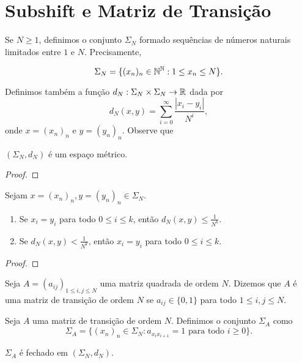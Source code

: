 \section{Subshift e Matriz de Transição}

Se $N \geq 1$, definimos o conjunto $\Sigma_N$ formado sequências de números naturais limitados entre $1$ e $N$. Precisamente,

$$\Sigma_N = \{ (x_n)_n \in \mathbb{N}^{\mathbb{N}} : 1 \leq x_n \leq N \}.$$

Definimos também a função $d_N : \Sigma_N \times \Sigma_N \to \mathbb{R}$ dada por
$$d_N(x, y) = \sum_{i=0}^\infty \frac{|x_i - y_i|}{N^i},$$
onde $x = (x_n)_n$ e $y = (y_n)_n$. Observe que 


\begin{proposition}
$(\Sigma_N, d_N)$ é um espaço métrico.
\end{proposition}


\begin{proof}

\end{proof}


\begin{proposition}
Sejam $x = (x_n)_n, y = (y_n)_n \in \Sigma_N$.
\begin{enumerate}
\item Se $x_i = y_i$ para todo $0 \leq i \leq k$, então $d_N(x, y) \leq \frac{1}{N^k}$.
\item Se $d_N(x, y) < \frac{1}{N^k}$, então $x_i = y_i$ para todo $0 \leq i \leq k$.
\end{enumerate}
\end{proposition}


\begin{proof}

\end{proof}


\begin{definition}
Seja $A = (a_{ij})_{1 \leq i,j \leq N}$ uma matriz quadrada de ordem $N$. Dizemos que $A$ é uma matriz de transição de ordem $N$ se $a_{ij} \in \{ 0, 1 \}$ para todo $1 \leq i,j \leq N$.
\end{definition}

Seja $A$ uma matriz de transição de ordem $N$. Definimos o conjunto $\Sigma_A$ como
$$\Sigma_A = \{ (x_n)_n \in \Sigma_N : a_{x_i x_{i+1}} = 1 \textrm{ para todo } i \geq 0 \}.$$

\begin{proposition}
$\Sigma_A$ é fechado em $(\Sigma_N, d_N)$.
\end{proposition}


